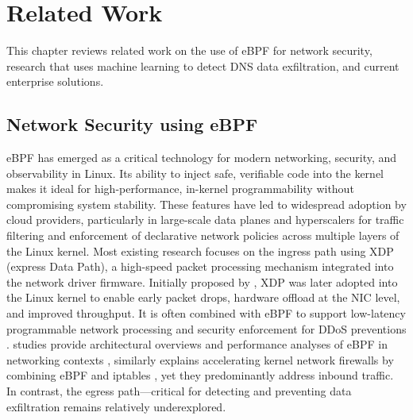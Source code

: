 \documentclass [11pt, proquest] {uwthesis}[2020/02/24]
\begin{document}
\chapter {Related Work}
This chapter reviews related work on the use of eBPF for network security, research that uses machine learning to detect DNS data exfiltration, and current enterprise solutions.

\section{Network Security using eBPF}
eBPF has emerged as a critical technology for modern networking, security, and observability in Linux. Its ability to inject safe, verifiable code into the kernel makes it ideal for high-performance, in-kernel programmability without compromising system stability. These features have led to widespread adoption by cloud providers, particularly in large-scale data planes and hyperscalers for traffic filtering and enforcement of declarative network policies across multiple layers of the Linux kernel. Most existing research focuses on the ingress path using XDP (express Data Path), a high-speed packet processing mechanism integrated into the network driver firmware. Initially proposed by \citeauthor{10.1145/3281411.3281443}, XDP was later adopted into the Linux kernel to enable early packet drops, hardware offload at the NIC level, and improved throughput. It is often combined with eBPF to support low-latency programmable network processing and security enforcement for DDoS preventions \cite{10.1145/3281411.3281443, 8850758}.
\citeauthor{10.1145/3371038} studies provide architectural overviews and performance analyses of eBPF in networking contexts \cite{10.1145/3371038}, similarly \citeauthor{bertrone2018accelerating} explains accelerating kernel network firewalls by combining eBPF and iptables \cite{bertrone2018accelerating}, yet they predominantly address inbound traffic. In contrast, the egress path—critical for detecting and preventing data exfiltration remains relatively underexplored. 

\end{document}
